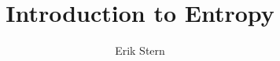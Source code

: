 \documentclass{article}
\title{Introduction to Entropy}
\author{Erik Stern}
\theoremstyle{plain}
\theoremstyle{definition}
\begin{document}




\FloatBarrier

\printbibliography
\end{document}

